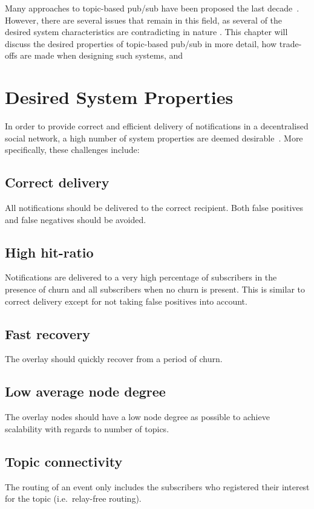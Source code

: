 Many approaches to topic-based pub/sub have been proposed the last
decade~\cites{Baehni:2004}{Castro:2002}{Chockler:2007}{Rahimian:2011}{Girdzijauskas:2010}{Matos:2010}{Wong:2008}{Zhuang:2001}.
However, there are several issues that remain in this field, as several
of the desired system characteristics are contradicting in nature
\cite{Setty:2012}. This chapter will discuss the desired properties of
topic-based pub/sub in more detail, how trade-offs are made when
designing such systems, and

\section{Desired System Properties}
In order to provide correct and efficient delivery of notifications in a
decentralised social network, a high number of system properties are
deemed desirable~\cite{Setty:2012}. More specifically, these challenges
include:

\subsection{Correct delivery}
All notifications should be delivered to the
correct recipient. Both false positives and false negatives should be
avoided.

\subsection{High hit-ratio}
Notifications are delivered to a very high
percentage of subscribers in the presence of churn and all subscribers
when no churn is present. This is similar to correct delivery except for
not taking false positives into account.

\subsection{Fast recovery}
The overlay should quickly recover from a
period of churn.

\subsection{Low average node degree}
The overlay nodes should have a low
node degree as possible to achieve scalability with regards to number of
topics.

\subsection{Topic connectivity}
The routing of an event only includes the
subscribers who registered their interest for the topic (i.e.\
relay-free routing).

